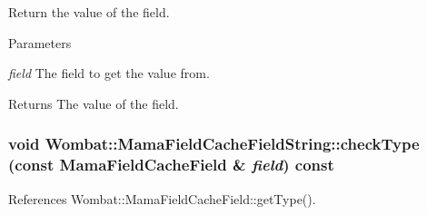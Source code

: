 Return the value of the field. 
\begin{DoxyParams}{Parameters}
\item[{\em field}]The field to get the value from. \end{DoxyParams}
\begin{DoxyReturn}{Returns}
The value of the field. 
\end{DoxyReturn}
\hypertarget{classWombat_1_1MamaFieldCacheFieldString_a02461a9b591cea2aee32ea591a18d04a}{
\subsubsection[{checkType}]{\setlength{\rightskip}{0pt plus 5cm}void Wombat::MamaFieldCacheFieldString::checkType (const {\bf MamaFieldCacheField} \& {\em field}) const}}
\label{classWombat_1_1MamaFieldCacheFieldString_a02461a9b591cea2aee32ea591a18d04a}


References Wombat::MamaFieldCacheField::getType().